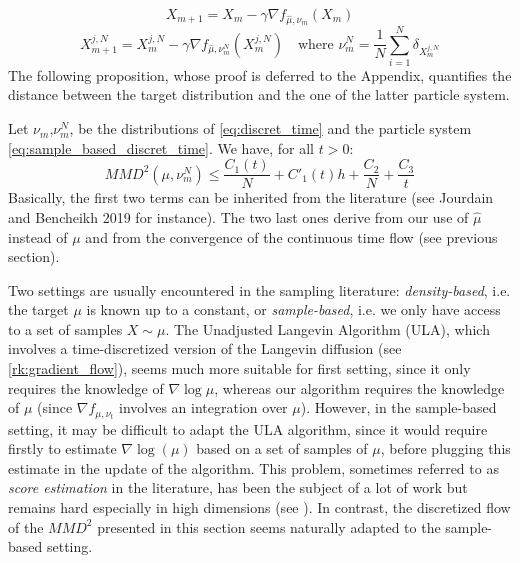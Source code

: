 \begin{equation}\label{eq:discret_time}
X_{m+1}=X_m - \gamma \nabla f_{\widehat{\mu}, \nu_m}(X_m) \end{equation}
\begin{equation}\label{eq:sample_based_discret_time}
X_{m+1}^{j,N}=X_{m}^{j,N}- \gamma \nabla f_{\widehat{\mu}, \nu_m^N}(X_m^{j,N}) \quad \text{where } \nu_m^N=\frac{1}{N} \sum_{i=1}^N \delta_{X_m^{j,N}}
\end{equation}
The following proposition, whose proof is deferred to the Appendix, quantifies the distance between the target distribution and the one of the latter particle system.
\begin{proposition}
	Let $\nu_m$,$\nu_m^N$, be the distributions of \eqref{eq:discret_time} and the particle system \eqref{eq:sample_based_discret_time}. We have, for all $t>0$:
	\begin{equation}
	MMD^2(\mu,\nu_m^N)\le \frac{C_1(t)}{N}+ C'_1(t)h + \frac{C_2}{N} +  \frac{C_3}{t}
	\end{equation}
	Basically, the first two terms can be inherited from the literature (see Jourdain and Bencheikh 2019 for instance). The two last ones derive from our use of $\widehat{\mu}$ instead of $\mu$ and from the convergence of the continuous time flow (see previous section).
\end{proposition}

\begin{remark}
	Two settings are usually encountered in the sampling literature: \textit{density-based}, i.e. the target $\mu$ is known up to a constant, or \textit{sample-based}, i.e. we only have access to a set of samples $X \sim \mu$.
	The Unadjusted Langevin Algorithm (ULA), which involves a time-discretized version of the Langevin diffusion (see \cref{rk:gradient_flow}), seems much more suitable for first setting, since it only requires the knowledge of $\nabla \log \mu$, whereas our algorithm requires the knowledge of $\mu$ (since $\nabla f_{\mu, \nu_t}$ involves an integration over $\mu$). However, in the sample-based setting, it may be difficult to adapt the ULA algorithm, since it would require firstly to estimate $\nabla \log(\mu)$ based on a set of samples of $\mu$, before plugging this estimate in the update of the algorithm. This problem, sometimes referred to as \textit{score estimation} in the literature, has been the subject of a lot of work but remains hard especially in high dimensions (see \cite{sutherland2017efficient,li2018gradient,shi2018spectral}). In contrast, the discretized flow of the $MMD^2$ presented in this section seems naturally adapted to the sample-based setting.
\end{remark}